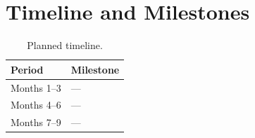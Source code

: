 ﻿\section{Timeline and Milestones}
\label{sec:timeline-and-milestones}


\begin{table}[H]
  \centering
  \caption{Planned timeline.}
  \label{tab:timeline-and-milestones}
  \begin{tabular}{ll}
    \toprule
    Period & Milestone \\
    \midrule
    Months 1--3 & --- \\
    Months 4--6 & --- \\
    Months 7--9 & --- \\
    \bottomrule
  \end{tabular}
\end{table}
